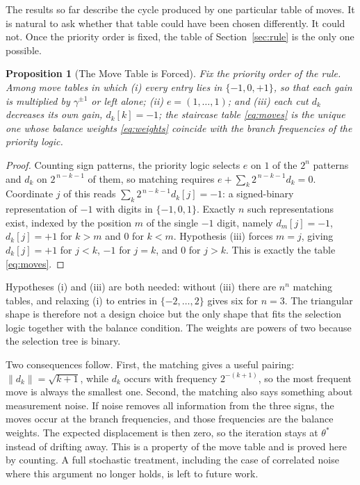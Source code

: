 \documentclass[letterpaper, 10pt, conference, twocolumn]{ieeeconf}
\newtheorem{proposition}{Proposition}
\begin{document}
The results so far describe the cycle produced by one particular table of
moves. It is natural to ask whether that table could have been chosen
differently. It could not. Once the priority order is fixed, the table of
Section~\ref{sec:rule} is the only one possible.

\begin{proposition}[The Move Table is Forced]
\label{prop:unique}
Fix the priority order of the rule. Among move tables in which
(i) every entry lies in $\{-1, 0, +1\}$, so that each gain is multiplied by
$\gamma^{\pm 1}$ or left alone; (ii) $e = (1, \dots, 1)$; and (iii) each
cut $d_k$ decreases its own gain, $d_k[k] = -1$; the staircase table
\eqref{eq:moves} is the \emph{unique} one whose balance weights
\eqref{eq:weights} coincide with the branch frequencies of the priority
logic.
\end{proposition}

\begin{proof}
Counting sign patterns, the priority logic selects $e$ on $1$ of the $2^n$
patterns and $d_k$ on $2^{\,n-k-1}$ of them, so matching requires
$e + \sum_k 2^{\,n-k-1} d_k = 0$. Coordinate $j$ of this reads
$\sum_k 2^{\,n-k-1} d_k[j] = -1$: a signed-binary representation of $-1$ with
digits in $\{-1,0,1\}$. Exactly $n$ such representations exist, indexed by the
position $m$ of the single $-1$ digit, namely $d_m[j] = -1$, $d_k[j] = +1$
for $k > m$ and $0$ for $k < m$. Hypothesis (iii) forces $m = j$, giving
$d_k[j] = +1$ for $j < k$, $-1$ for $j = k$, and $0$ for $j > k$. This is
exactly the table \eqref{eq:moves}.
\end{proof}

Hypotheses (i) and (iii) are both needed: without (iii) there are $n^n$
matching tables, and relaxing (i) to entries in $\{-2, \dots, 2\}$ gives six for
$n = 3$. The triangular shape is therefore not a design choice but the only
shape that fits the selection logic together with the balance condition. The
weights are powers of two because the selection tree is binary.

Two consequences follow. First, the matching gives a useful pairing:
$\lVert d_k \rVert = \sqrt{k+1}$, while $d_k$ occurs with frequency
$2^{-(k+1)}$, so the most frequent move is always the smallest one. Second,
the matching also says something about measurement noise. If noise removes all information from the three signs, the moves occur
at the branch frequencies, and those frequencies are the balance weights. The
expected displacement is then zero, so the iteration stays at $\theta^*$
instead of drifting away. This is a property of the move table and is proved
here by counting. A full stochastic treatment, including the case of
correlated noise where this argument no longer holds, is left to future work.
\end{document}
